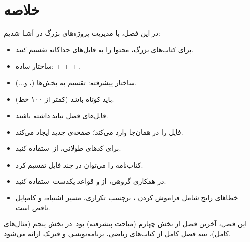 \section{خلاصه}
\label{sec:large-projects-summary}

در این فصل، با مدیریت پروژه‌های بزرگ در
 آشنا شدیم:

\begin{itemize}
    \item برای کتاب‌های بزرگ، محتوا را به
    فایل‌های جداگانه تقسیم کنید.

    \item ساختار ساده:  +
     +  +
    .

    \item ساختار پیشرفته: تقسیم به بخش‌ها
    (،  و...).

    \item {} باید کوتاه باشد
    (کمتر از ۱۰۰ خط).

    \item فایل‌های فصل نباید
     داشته باشند.

    \item {} فایل را در همان‌جا
    وارد می‌کند؛  صفحه‌ی
    جدید ایجاد می‌کند.

    \item برای کدهای طولانی، از
     استفاده کنید.

    \item کتاب‌نامه را می‌توان در چند فایل
     تقسیم کرد.

    \item در همکاری گروهی، از 
    و قواعد یکدست استفاده کنید.

    \item خطاهای رایج شامل فراموش کردن
    ، برچسب تکراری، مسیر
    اشتباه، و کامپایل ناقص است.
\end{itemize}

این فصل، آخرین فصل از بخش چهارم (مباحث
پیشرفته) بود. در بخش پنجم (مثال‌های کامل)،
سه فصل کامل از کتاب‌های ریاضی، برنامه‌نویسی
و فیزیک ارائه می‌شود.